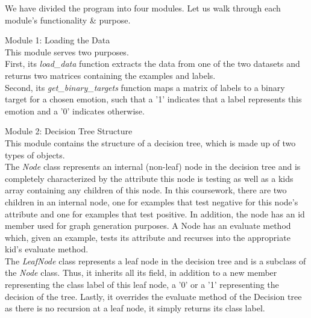 We have divided the program into four modules. Let us walk through each module's functionality \& purpose.

Module 1: Loading the Data \\
This module serves two purposes.\\
First, its \emph{load\_data} function extracts the data from one of the two datasets
and returns two matrices containing the examples and labels. \\
Second, its \emph{get\_binary\_targets} function maps a matrix of labels to a binary target for a chosen emotion,
such that a '1' indicates that a label represents this emotion and a '0' indicates otherwise.

Module 2: Decision Tree Structure \\
This module contains the structure of a decision tree, which is made up of two types of objects. \\
The \emph{Node} class represents an internal (non-leaf) node in the decision tree and is completely characterized by the attribute
this node is testing as well as a kids array containing any children of this node. In this coursework, there are two children
in an internal node, one for examples that test negative for this node's attribute and one for examples that test positive.
In addition, the node has an id member used for graph generation purposes.
A Node has an evaluate method which, given an example, tests its attribute and recurses into the appropriate kid's evaluate method. \\
The \emph{LeafNode} class represents a leaf node in the decision tree and is a subclass of the \emph{Node} class.
Thus, it inherits all its field, in addition to a new member representing the class label of this leaf node,
a '0' or a '1' representing the decision of the tree.
Lastly, it overrides the evaluate method of the Decision tree as there is no recursion at a leaf node, it simply returns its class label.\\



